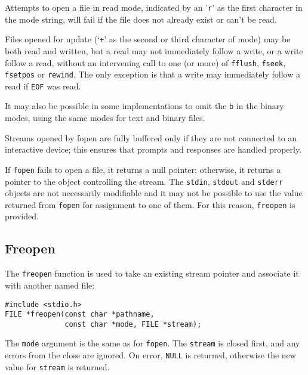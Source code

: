    Attempts to open a file in read mode, indicated by an '\texttt{r}' as
    the  first  character  in  the mode string, will fail if the file does not
    already exist or can't be read.


   Files  opened  for  update  (`\texttt{+}'  as  the  second  or
    third character  of mode) may be both read and written, but a read may not
    immediately follow a write,  or  a  write  follow  a read,  without  an
    intervening  call  to  one  (or more) of \texttt{fflush},
    \texttt{fseek}, \texttt{fsetpos} or \texttt{rewind}.   The
    only  exception  is that a write may immediately follow a read if
    \texttt{EOF} was read.


   It may also be possible in some implementations to omit  the
    \texttt{b}  in  the  binary  modes, using the same modes for text and
    binary files.


   Streams opened by fopen are fully buffered only if they  are not
    connected  to  an interactive device; this ensures that prompts and
    responses are handled properly.


   If \texttt{fopen} fails to open a file, it returns  a  null  pointer;
    otherwise,  it  returns  a pointer to the object controlling the stream.
    The \texttt{stdin}, \texttt{stdout} and \texttt{stderr}
    objects  are  not necessarily modifiable and it may not be possible to use
    the value returned from \texttt{fopen} for assignment  to  one  of
    them.  For this reason, \texttt{freopen} is provided.


  

  \subsection{Freopen}
   

   The \texttt{freopen} function is used to take an existing stream
    pointer and associate it with another named file:


   \begin{Verbatim}
#include <stdio.h>
FILE *freopen(const char *pathname,
              const char *mode, FILE *stream);
\end{Verbatim}

   The \texttt{mode} argument is the same as for \texttt{fopen}.
    The  \texttt{stream}  is closed first, and any errors from the close
    are ignored.  On error, \texttt{NULL} is returned, otherwise the new
    value for \texttt{stream} is returned.


